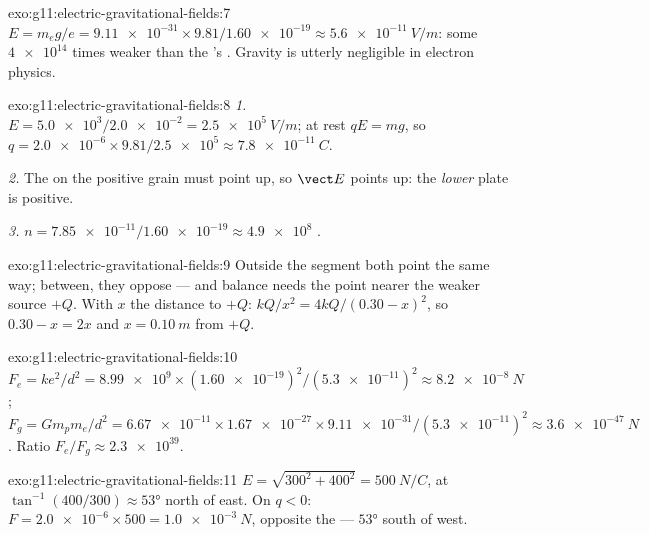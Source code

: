 \begin{solution}{exo:g11:electric-gravitational-fields:7}
$E = m_e g / e = \num{9.11e-31} \times 9.81 / \num{1.60e-19}
\approx \qty{5.6e-11}{V/m}$: some $\num{4e14}$ times weaker than the
's . Gravity is utterly negligible in electron physics.
\end{solution}

\begin{solution}{exo:g11:electric-gravitational-fields:8}
\emph{1.} $E = \num{5.0e3} / \num{2.0e-2} = \qty{2.5e5}{V/m}$; at rest
$qE = mg$, so
$q = \num{2.0e-6} \times 9.81 / \num{2.5e5} \approx \qty{7.8e-11}{C}$.

\emph{2.} The  on the positive grain must point up, so $\vect E$
points up: the \emph{lower} plate is positive.

\emph{3.} $n = \num{7.85e-11} / \num{1.60e-19} \approx \num{4.9e8}$
.
\end{solution}

\begin{solution}{exo:g11:electric-gravitational-fields:9}
Outside the segment both  point the same way; between, they
oppose --- and balance needs the point nearer the weaker source $+Q$.
With $x$ the distance to $+Q$: $kQ/x^2 = 4kQ/(0.30 - x)^2$, so
$0.30 - x = 2x$ and $x = \qty{0.10}{m}$ from $+Q$.
\end{solution}

\begin{solution}{exo:g11:electric-gravitational-fields:10}
$F_e = ke^2/d^2 = \num{8.99e9} \times (\num{1.60e-19})^2 /
(\num{5.3e-11})^2 \approx \qty{8.2e-8}{N}$;
$F_g = G m_p m_e / d^2 = \num{6.67e-11} \times \num{1.67e-27} \times
\num{9.11e-31} / (\num{5.3e-11})^2 \approx \qty{3.6e-47}{N}$. Ratio
$F_e / F_g \approx \num{2.3e39}$.
\end{solution}

\begin{solution}{exo:g11:electric-gravitational-fields:11}
$E = \sqrt{300^2 + 400^2} = \qty{500}{N/C}$, at
$\tan^{-1}(400/300) \approx \ang{53}$ north of east. On $q < 0$:
$F = \num{2.0e-6} \times 500 = \qty{1.0e-3}{N}$, opposite the  ---
$\ang{53}$ south of west.
\end{solution}

